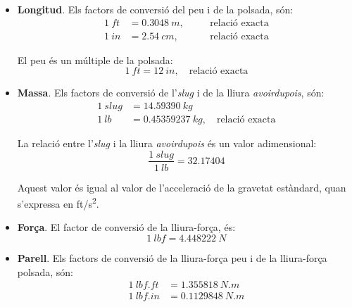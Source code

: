 \begin{itemize}
    \item \textbf{Longitud}. Els factors de conversió del peu i de la polsada, són:
    \begin{subequations}
    \begin{alignat}{3}
      \qty{1}{ft} &= \qty{0,3048}{m}, &&\quad\text{relació exacta} \\
      \qty{1}{in} &= \qty{2,54}{cm}, &&\quad\text{relació exacta}
    \end{alignat}
    \end{subequations}

    El peu és un múltiple  de la polsada:
    \begin{equation}
      \qty{1}{ft} = \qty{12}{in},\quad\text{relació exacta}
    \end{equation}

    \item \textbf{Massa}. Els factors de conversió de l'\textit{slug}  i de la lliura \textit{avoirdupois}, són:
    \begin{subequations}
    \begin{align}
      \qty{1}{slug} &= \qty{14,59390}{kg} \\
      \qty{1}{lb} &= \qty{0,45359237}{kg},\quad\text{relació exacta}
    \end{align}
    \end{subequations}

    La relació entre l'\textit{slug} i la lliura \textit{avoirdupois} és un valor adimensional:
    \begin{equation}
        \frac{\qty{1}{slug}}{\qty{1}{lb}}=\num{32,17404}
    \end{equation}

    Aquest valor és igual al valor de l'acceleració de la gravetat estàndard, quan s'expressa en \unit{ft/s^2}.

    \item \textbf{Força}. El factor de conversió de la lliura-força, és:
    \begin{equation}
        \qty{1}{lbf} = \qty{4,448222}{N}
    \end{equation}

    \item \textbf{Parell}. Els factors de conversió de la lliura-força peu  i de la lliura-força polsada, són:
    \begin{subequations}
    \begin{align}
      \qty{1}{lbf.ft} &= \qty{1,355818}{N.m} \\
      \qty{1}{lbf.in} &= \qty{0,1129848}{N.m}
    \end{align}
    \end{subequations}


\end{itemize}
